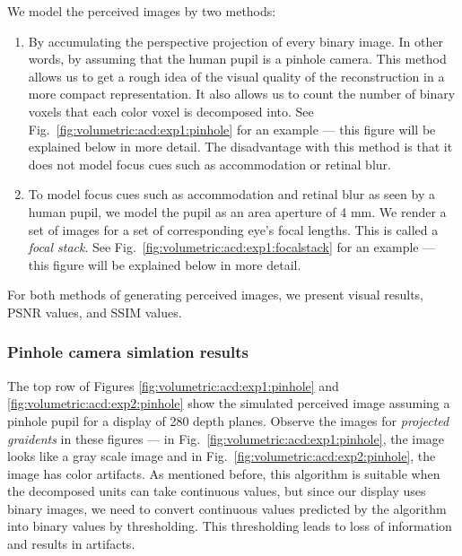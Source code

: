 We model the perceived images by two methods:
\begin{enumerate}
\item By accumulating the perspective projection of every binary image. In other words, by assuming that the human pupil is a pinhole camera. This method allows us to get a rough idea of the visual quality of the reconstruction in a more compact representation. It also allows us to count the number of binary voxels that each color voxel is decomposed into. See Fig.~\ref{fig:volumetric:acd:exp1:pinhole} for an example --- this figure will be explained below in more detail. The disadvantage with this method is that it does not model focus cues such as accommodation or retinal blur.
\item To model focus cues such as accommodation and retinal blur as seen by a human pupil, we model the pupil as an area aperture of 4 mm. We render a set of images for a set of corresponding eye's focal lengths. This is called a \emph{focal stack}. See Fig.~\ref{fig:volumetric:acd:exp1:focalstack} for an example --- this figure will be explained below in more detail.
\end{enumerate}

For both methods of generating perceived images, we present visual results, PSNR values, and SSIM values. 

\subsubsection{Pinhole camera simlation results}





The top row of Figures \ref{fig:volumetric:acd:exp1:pinhole} and \ref{fig:volumetric:acd:exp2:pinhole} show the simulated perceived image assuming a pinhole pupil for a display of 280 depth planes. Observe the images for \emph{projected graidents} in these figures --- in Fig.~\ref{fig:volumetric:acd:exp1:pinhole}, the image looks like a gray scale image and in Fig.~\ref{fig:volumetric:acd:exp2:pinhole}, the image has color artifacts. As mentioned before, this algorithm is suitable when the decomposed units can take continuous values, but since our display uses binary images, we need to convert continuous values predicted by the algorithm into binary values by thresholding. This thresholding leads to loss of information and results in artifacts. 

